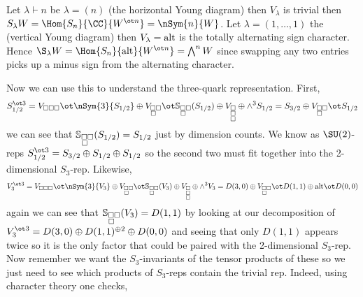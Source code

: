 \documentclass[12pt]{article}
\begin{document}
\begin{example}
Let $\lambda \vdash n$ be $\lambda = (n)$ (the horizontal Young diagram) then $V_\lambda$ is trivial then $S_\lambda W = \Hom{S_n}{\CC}{W^{\ot n}} = \nSym{n}{W}$. Let $\lambda = (1, \dots, 1)$ the (vertical Young diagram) then $V_\lambda = \mathrm{alt}$ is the totally alternating sign character. Hence $\S_\lambda W = \Hom{S_n}{\alt}{W^{\ot n}} = \bigwedge^n W$ since swapping any two entries picks up a minus sign from the alternating character.
\end{example}

Now we can use this to understand the three-quark representation. First,
\[ S_{1/2}^{\ot 3} = V_{\square \square \square} \ot \nSym{3}{S_{1/2}} \oplus V_{\substack{\square \square \\ \square \,\,\,\,}} \ot \SS_{\substack{\square \square \\ \square \,\,\,\,}}(S_{1/2}) \oplus V_{\substack{\substack{\square \\ \square} \\ \square}} \oplus \wedge^3 S_{1/2} = S_{3/2} \oplus V_{\substack{\square \square \\ \square \,\,\,\,}} \ot S_{1/2}   \]
we can see that $\mathbb{S}_{\substack{\square \square \\ \square \,\,\,\,}}(S_{1/2}) = S_{1/2}$ just by dimension counts. We know as $\SU(2)$-reps $S_{1/2}^{\ot 3} = S_{3/2} \oplus S_{1/2} \oplus S_{1/2}$ so the second two must fit together into the 2-dimensional $S_3$-rep. Likewise,
\[ V_3^{\ot 3} = V_{\square \square \square} \ot \nSym{3}{V_3} \oplus V_{\substack{\square \square \\ \square \,\,\,\,}} \ot \SS_{\substack{\square \square \\ \square \,\,\,\,}}(V_3) \oplus V_{\substack{\substack{\square \\ \square} \\ \square}} \oplus \wedge^3 V_3 = D(3,0) \oplus V_{\substack{\square \square \\ \square \,\,\,\,}} \ot D(1,1) \oplus \alt \ot D(0,0) \]
again we can see that $\mathbb{S}_{\substack{\square \square \\ \square \,\,\,\,}}(V_3) = D(1,1)$ by looking at our decomposition of $V_3^{\ot 3} = D(3,0) \oplus D(1,1)^{\oplus 2} \oplus D(0,0)$ and seeing that only $D(1,1)$ appears twice so it is the only factor that could be paired with the 2-dimensional $S_3$-rep. Now remember we want the $S_3$-invariants of the tensor products of these so we just need to see which products of $S_3$-reps contain the trivial rep. Indeed, using character theory one checks,
\end{document}

